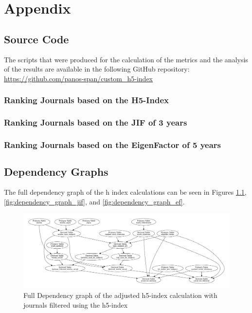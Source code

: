 \chapter{Appendix}
\label{ch:appendix}

\section{Source Code}

The scripts that were produced for the calculation of the metrics and the
analysis of the results are available in the following GitHub repository:
\url{
    https://github.com/panos-span/custom_h5-index
}

\subsection{Ranking Journals based on the H5-Index}


\subsection{Ranking Journals based on the JIF of 3 years}

\subsection{Ranking Journals based on the EigenFactor of 5 years}



\section{Dependency Graphs}
The full dependency graph of the h index calculations can be seen
in Figures \ref{fig:dependency_graph_h5}, \ref{fig:dependency_graph_jif},
and \ref{fig:dependency_graph_ef}.

\begin{figure}[H]
    \centering
    \includegraphics[width=\textwidth]{../figs/full-graph_h5.pdf}
    \caption{Full Dependency graph of the adjusted h5-index calculation with journals filtered using the h5-index}
    \label{fig:dependency_graph_h5}
\end{figure}

